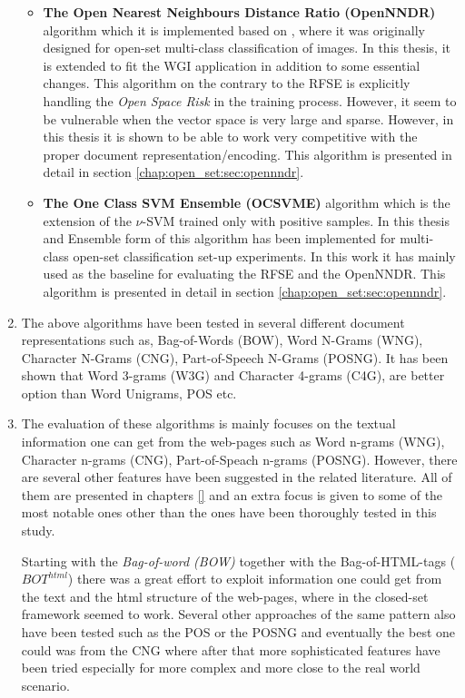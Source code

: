 \begin{enumerate}
\begin{itemize}
\item \textbf{The Open Nearest Neighbours Distance Ratio (OpenNNDR)} algorithm which it is implemented based on \parencite{mendesjunior2016}, where it was originally designed for open-set multi-class classification of images. In this thesis, it is  extended to fit the WGI application in addition to some essential changes. This algorithm on the contrary to the RFSE is explicitly handling the \textit{Open Space Risk} in the training process. However, it seem to be vulnerable when the vector space is very large and sparse. However, in this thesis it is shown to be able to work very competitive with the proper document representation/encoding. This algorithm is presented in detail in section \ref{chap:open_set:sec:opennndr}.
\item \textbf{The One Class SVM Ensemble (OCSVME)} algorithm which is the extension of the $\nu$-SVM trained only with positive samples. In this thesis and Ensemble form of this algorithm has been implemented for multi-class open-set classification set-up experiments. In this work it has mainly used as the baseline for evaluating the RFSE and the OpenNNDR. This algorithm is presented in detail in section \ref{chap:open_set:sec:opennndr}.
\end{itemize}

\item The above algorithms have been tested in several different document representations such as, Bag-of-Words (BOW), Word N-Grams (WNG), Character N-Grams (CNG), Part-of-Speech N-Grams (POSNG). It has been shown that Word 3-grams (W3G) and Character 4-grams (C4G), are better option than Word Unigrams, POS etc.
\item The evaluation of these algorithms is mainly focuses on the textual information one can get from the web-pages such as Word n-grams (WNG), Character n-grams (CNG), Part-of-Speach n-grams (POSNG). However, there are several other features have been suggested in the related literature. All of them are presented in chapters \ref{} and an extra focus is given to some of the most notable ones other than the ones have been thoroughly tested in this study.

Starting with the \textit{Bag-of-word (BOW)} together with the Bag-of-HTML-tags ($BOT^{html}$) there was a great effort to exploit information one could get from the text and the html structure of the web-pages, where in the closed-set framework seemed to work. Several other approaches of the same pattern also have been tested such as the POS or the POSNG and eventually the best one could was from the CNG where after that more sophisticated features have been tried especially for more complex and more close to the real world scenario.


\end{enumerate}
